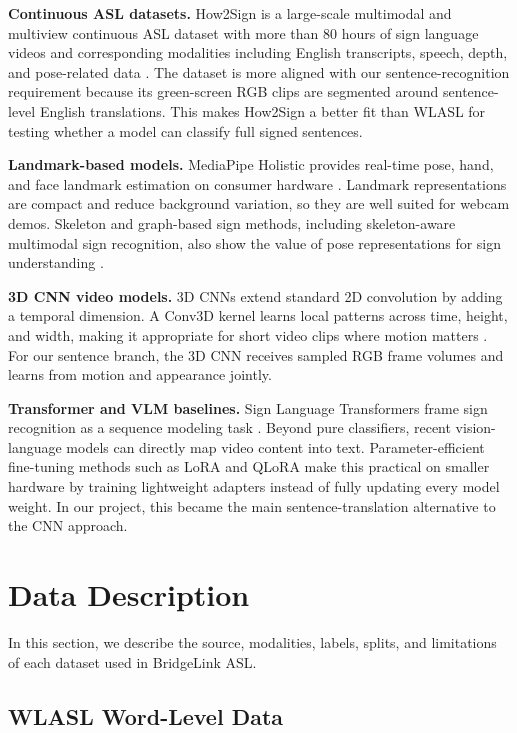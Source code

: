 \documentclass[10pt,twocolumn,letterpaper]{article}
\begin{document}
\textbf{Continuous ASL datasets.} How2Sign is a large-scale multimodal and multiview continuous ASL dataset with more than 80 hours of sign language videos and corresponding modalities including English transcripts, speech, depth, and pose-related data \cite{duarte2021how2sign}. The dataset is more aligned with our sentence-recognition requirement because its green-screen RGB clips are segmented around sentence-level English translations. This makes How2Sign a better fit than WLASL for testing whether a model can classify full signed sentences.

\textbf{Landmark-based models.} MediaPipe Holistic provides real-time pose, hand, and face landmark estimation on consumer hardware \cite{grishchenko2020mediapipe}. Landmark representations are compact and reduce background variation, so they are well suited for webcam demos. Skeleton and graph-based sign methods, including skeleton-aware multimodal sign recognition, also show the value of pose representations for sign understanding \cite{jiang2021slgcn}.

\textbf{3D CNN video models.} 3D CNNs extend standard 2D convolution by adding a temporal dimension. A Conv3D kernel learns local patterns across time, height, and width, making it appropriate for short video clips where motion matters \cite{tran2015c3d}. For our sentence branch, the 3D CNN receives sampled RGB frame volumes and learns from motion and appearance jointly.

\textbf{Transformer and VLM baselines.} Sign Language Transformers frame sign recognition as a sequence modeling task \cite{camgoz2020signtransformer}. Beyond pure classifiers, recent vision-language models can directly map video content into text. Parameter-efficient fine-tuning methods such as LoRA \cite{hu2022lora} and QLoRA \cite{dettmers2023qlora} make this practical on smaller hardware by training lightweight adapters instead of fully updating every model weight. In our project, this became the main sentence-translation alternative to the CNN approach.

\section{Data Description}

In this section, we describe the source, modalities, labels, splits, and limitations of each dataset used in BridgeLink ASL.

\subsection{WLASL Word-Level Data}
\end{document}
